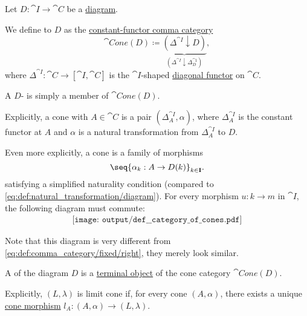 \begin{definition}\label{def:category_of_cones}
  Let \( D: \cat{I} \to \cat{C} \) be a \hyperref[def:categorical_diagram]{diagram}.

  \begin{thmenum}
     We define  to \( D \) as the \hyperref[def:comma_category/fixed]{constant-functor comma category}
    \begin{equation*}
      \cat{Cone}(D) \coloneqq \underbrace{ (\Delta^{\cat{I}} \downarrow D) }_{(\Delta^{\cat{I}} \downarrow \Delta^{\cat{1}}_{D})},
    \end{equation*}
    where \( \Delta^{\cat{I}}: \cat{C} \to [\cat{I}, \cat{C}] \) is the \( \cat{I} \)-shaped \hyperref[def:diagonal_functor]{diagonal functor} on \( \cat{C} \).

     A \( D \)- is simply a member of \( \cat{Cone}(D) \).

    Explicitly, a cone with  \( A \in \cat{C} \) is a pair \( (\Delta^{\cat{I}}_A, \alpha) \), where \( \Delta^{\cat{I}}_A \) is the constant functor at \( A \) and \( \alpha \) is a natural transformation from \( \Delta^{\cat{I}}_A \) to \( D \).

    Even more explicitly, a cone is a family of morphisms
    \begin{equation}\label{eq:def:category_of_cones/cone}
      \seq{ \alpha_k: A \to D(k) }_{k \in \cat{I}}.
    \end{equation}
    satisfying a simplified naturality condition (compared to \eqref{eq:def:natural_transformation/diagram}). For every morphism \( u: k \to m \) in \( \cat{I} \), the following diagram must commute:
    \begin{equation}\label{eq:def:category_of_cones/cone_nat}
      \begin{aligned}
        \texttt{[image: output/def\_\_category\_of\_cones.pdf]}
      \end{aligned}
    \end{equation}

    Note that this diagram is very different from \eqref{eq:def:comma_category/fixed/right}, they merely look similar.

     A  of the diagram \( D \) is a \hyperref[def:universal_objects/terminal]{terminal object} of the cone category \( \cat{Cone}(D) \).

    Explicitly, \( (L, \lambda) \) is limit cone if, for every cone \( (A, \alpha) \), there exists a unique \hyperref[eq:def:comma_category/fixed/right]{cone morphism} \( l_A: (A, \alpha) \to (L, \lambda) \).


\end{thmenum}
\end{definition}
